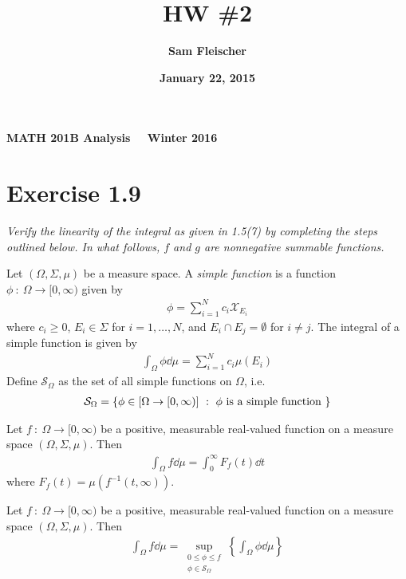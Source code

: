 \documentclass[12pt]{article}
\title{\bf HW \#2}
\author{\bf Sam Fleischer}
\date{\bf January 22, 2015}
\theoremstyle{plain}
\newenvironment{definition}[1][Definition]{\begin{trivlist}
\item[\hskip \labelsep {\bfseries #1}]}{\end{trivlist}}
\begin{document}
\textbf{MATH 201B \hfill Analysis \ \ \hfill Winter 2016\ \ \ }

{\let\newpage\relax\maketitle}

\section*{Exercise 1.9}
\textit{Verify the linearity of the integral as given in 1.5(7) by completing the steps outlined below.  In what follows, $f$ and $g$ are nonnegative summable functions.}

\begin{definition}[Definition: Simple Function]
    Let $(\Omega, \Sigma, \mu)$ be a measure space.  A \emph{simple function} is a function $\phi\ :\ \Omega \rightarrow [0, \infty)$ given by
    \begin{align*}
        \phi = \sum_{i=1}^N c_i \mathcal{X}_{E_i}
    \end{align*}
    where $c_i \geq 0$, $E_i \in \Sigma$ for $i = 1, \dots, N$, and $E_i \cap E_j = \emptyset$ for $i \neq j$.  The integral of a simple function is given by
    \begin{align*}
        \int_\Omega \phi \dd \mu = \sum_{i = 1}^N c_i \mu(E_i)
    \end{align*}
    Define $\mathcal{S}_\Omega$ as the set of all simple functions on $\Omega$, i.e.
    \begin{align*}
        \mathcal{S}_\Omega = \{\phi \in [\Omega \rightarrow [0, \infty)]\ :\ \phi \text{ \rm is a simple function }\}
    \end{align*}
\end{definition}
\begin{definition}[Definition 1: Lebesgue Integral]
    Let $f\ :\ \Omega \rightarrow [0, \infty)$ be a positive, measurable real-valued function on a measure space $(\Omega, \Sigma, \mu)$.  Then
    \begin{align*}
        \int_\Omega f \dd \mu = \int_0^\infty F_f(t) \dd t
    \end{align*}
    where $F_f(t) = \mu(f^{-1}(t, \infty))$.
\end{definition}
\begin{definition}[Definition 2: Lebesgue Integral]
    Let $f\ :\ \Omega \rightarrow [0, \infty)$ be a positive, measurable real-valued function on a measure space $(\Omega, \Sigma, \mu)$.  Then
    \begin{align*}
        \int_\Omega f \dd \mu = \sup_{\substack{0\leq\phi\leq f \\ \phi \in \mathcal{S}_\Omega}} \left\{\int_\Omega \phi \dd \mu\right\}
    \end{align*}
\end{definition}
\end{document}
